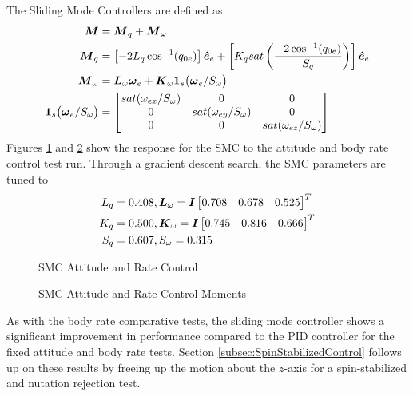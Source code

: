 The Sliding Mode Controllers are defined as
\begin{equation}
  \begin{aligned}
    \boldsymbol{M} &= \boldsymbol{M}_{q} + \boldsymbol{M}_{\omega} \\
    \boldsymbol{M}_{q} &= \left[-2 L_{q} \cos^{-1} (q_{0e}) \right] \boldsymbol{\hat{e}}_e + \left[ K_{q} sat \left( \frac{-2\cos^{-1} (q_{0e})}{S_q} \right) \right] \boldsymbol{\hat{e}}_e \\
    \boldsymbol{M}_{\omega} &= \boldsymbol{L}_{\omega} \boldsymbol{\omega}_e + \boldsymbol{K}_{\omega}\boldsymbol{1}_s \big(\boldsymbol{\omega}_e / S_{\omega} \big) \\
    \boldsymbol{1}_s \big(\boldsymbol{\omega}_e / S_{\omega} \big) &= \begin{bmatrix} sat (\omega_{ex} / S_{\omega}) &0 &0 \\ 0 & sat (\omega_{ey} / S_{\omega}) & 0 \\ 0 & 0 & sat (\omega_{ez} / S_{\omega}) \end{bmatrix}
  \end{aligned}
\end{equation}
Figures \ref{fig:SMCAttitudeAndRateControl} and \ref{fig:SMCAttitudeAndRateControlMoments} show the response for the SMC to the attitude and body rate control test run.  Through a gradient descent search, the SMC parameters are tuned to
\begin{equation}
  \begin{aligned}
    L_q &= 0.408, \boldsymbol{L}_{\omega} = \boldsymbol{I} \begin{bmatrix} 0.708 & 0.678 & 0.525 \end{bmatrix}^T \\
    K_q &= 0.500, \boldsymbol{K}_{\omega} = \boldsymbol{I} \begin{bmatrix} 0.745 & 0.816 & 0.666 \end{bmatrix}^T \\
    S_q &= 0.607, S_{\omega} = 0.315
  \end{aligned}
\end{equation}
\begin{figure}[H]
  \centerline{}
  \caption{SMC Attitude and Rate Control}
  \label{fig:SMCAttitudeAndRateControl}
\end{figure}
\begin{figure}[H]
  \centerline{}
  \caption{SMC Attitude and Rate Control Moments}
  \label{fig:SMCAttitudeAndRateControlMoments}
\end{figure}
As with the body rate comparative tests, the sliding mode controller shows a significant improvement in performance compared to the PID controller for the fixed attitude and body rate tests.  Section \ref{subsec:SpinStabilizedControl} follows up on these results by freeing up the motion about the $z$-axis for a spin-stabilized and nutation rejection test.

